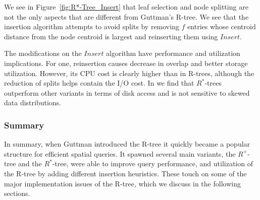 We see in Figure~\ref{fig:R*-Tree_Insert} that leaf selection and node splitting are not
the only aspects that are different from Guttman's R-tree. We see that the insertion 
algorithm attempts to avoid splits by removing $f$ entries whose centroid distance from 
the node centroid is largest and reinserting them using $Insert$. 
 
The modifications on the $Insert$ algorithm have performance and utilization implications. 
For one, reinsertion causes decrease in overlap and better storage utilization. However,
its CPU cost is clearly higher than in R-trees, although the reduction of splits helps 
contain the I/O cost. In \cite{Beckmann:1990:RER:93597.98741} we find that $R^{*}$-trees outperform other variants 
in terms of disk access and is not sensitive to skewed data distributions. 


\subsubsection{Summary}
In summary, when Guttman introduced the R-tree it quickly became a popular structure
for efficient spatial queries. It spawned several main variants, the $R^{+}$-tree
and the $R^{*}$-tree, were able to improve query performance, and utilization of
the R-tree by adding different insertion heuristics. These touch on some of the 
major implementation issues of the R-tree, which we discuss in the following 
sections.
